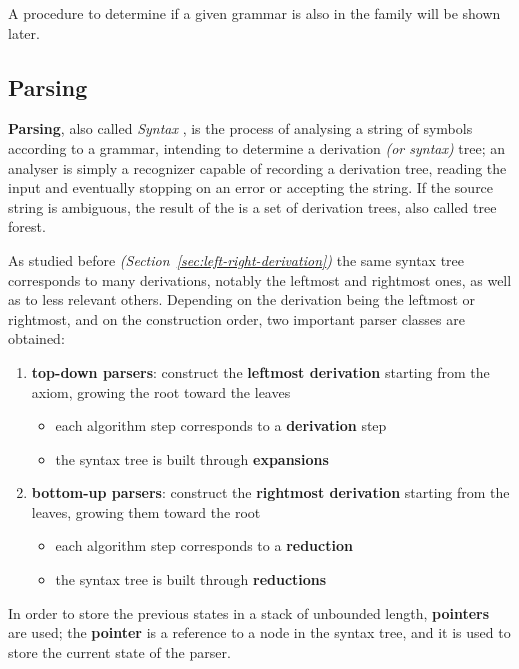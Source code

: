 \documentclass[english]{article}
\begin{document}
A procedure to determine if a given \CF grammar is also in the \DET family will be shown later. %

\subsection{Parsing}
\label{sec:parsing}

\textbf{Parsing}, also called \textit{Syntax }, is the process of analysing a string of symbols according to a grammar, intending to determine a derivation \textit{(or syntax)} tree;
an analyser is simply a recognizer capable of recording a derivation tree, reading the input and eventually stopping on an error or accepting the string.
If the source string is ambiguous, the result of the  is a set of derivation trees, also called tree forest.

As studied before \textit{(Section~\ref{sec:left-right-derivation})}
the same syntax tree corresponds to many derivations, notably the leftmost and rightmost ones, as well as to less relevant others.
Depending on the derivation being the leftmost or rightmost, and on the construction order, two important parser classes are obtained:

\begin{enumerate}
  \item \textbf{top-down parsers}: construct the \textbf{leftmost derivation} starting from the axiom, growing the root toward the leaves
        \begin{itemize}
          \item each algorithm step corresponds to a \textbf{derivation} step
          \item the syntax tree is built through \textbf{expansions}
        \end{itemize}
  \item \textbf{bottom-up parsers}: construct the \textbf{rightmost derivation} starting from the leaves, growing them toward the root
        \begin{itemize}
          \item each algorithm step corresponds to a \textbf{reduction}
          \item the syntax tree is built through \textbf{reductions}
        \end{itemize}
\end{enumerate}

\bigskip
In order to store the previous states in a stack of unbounded length, \textbf{pointers} are used;
the \textbf{pointer} is a reference to a node in the syntax tree, and it is used to store the current state of the parser.
\end{document}
